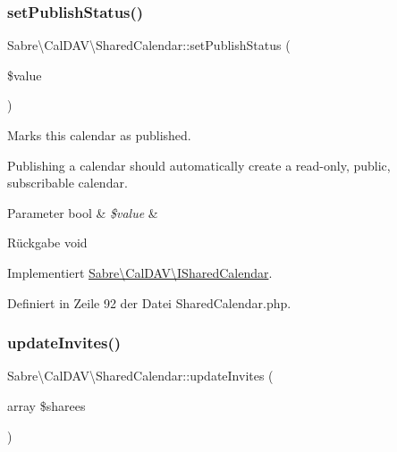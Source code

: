 \mbox{\label{class_sabre_1_1_cal_d_a_v_1_1_shared_calendar_afb4a48cd8825815b3bca60b342fb3dec}} 
\subsubsection{\texorpdfstring{set\+Publish\+Status()}{setPublishStatus()}}
{\footnotesize\ttfamily Sabre\textbackslash{}\+Cal\+D\+A\+V\textbackslash{}\+Shared\+Calendar\+::set\+Publish\+Status (\begin{DoxyParamCaption}\item[{}]{\$value }\end{DoxyParamCaption})}

Marks this calendar as published.

Publishing a calendar should automatically create a read-\/only, public, subscribable calendar.


\begin{DoxyParams}[1]{Parameter}
bool & {\em \$value} & \\
\hline
\end{DoxyParams}
\begin{DoxyReturn}{Rückgabe}
void 
\end{DoxyReturn}


Implementiert \mbox{\hyperlink{interface_sabre_1_1_cal_d_a_v_1_1_i_shared_calendar_ae4570744db00653320964124880c8f93}{Sabre\textbackslash{}\+Cal\+D\+A\+V\textbackslash{}\+I\+Shared\+Calendar}}.



Definiert in Zeile 92 der Datei Shared\+Calendar.\+php.

\mbox{\label{class_sabre_1_1_cal_d_a_v_1_1_shared_calendar_a6b8b622de08517a514d91581f95f09fa}} 
\subsubsection{\texorpdfstring{update\+Invites()}{updateInvites()}}
{\footnotesize\ttfamily Sabre\textbackslash{}\+Cal\+D\+A\+V\textbackslash{}\+Shared\+Calendar\+::update\+Invites (\begin{DoxyParamCaption}\item[{array}]{\$sharees }\end{DoxyParamCaption})}

